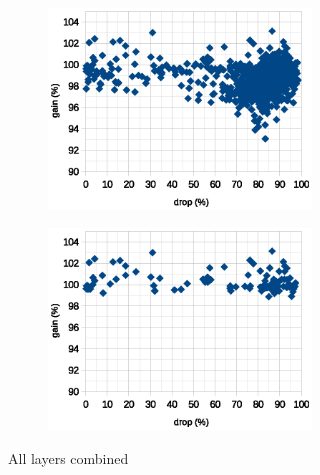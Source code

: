 \documentclass[12pt]{report}
\begin{document}
\begin{figure}[!ht]
	\centering
	\begin{subfigure}[b]{\linewidth}
		\begin{subfigure}[b]{0.49\linewidth}
			\centering
			\includegraphics[scale=0.7]{dia/all_all.eps}
		\end{subfigure}
		\begin{subfigure}[b]{0.49\linewidth}
			\centering
			\includegraphics[scale=0.7]{dia/best_all.eps}
		\end{subfigure}
		\caption{All layers combined}
	\end{subfigure}
	\begin{subfigure}[b]{\linewidth}

\end{subfigure}
\end{figure}
\end{document}

